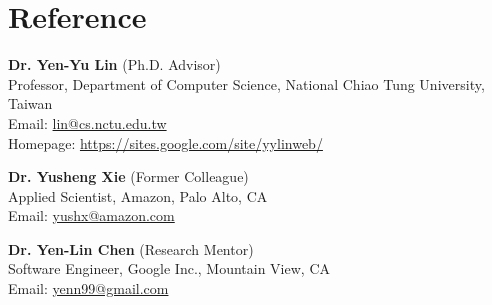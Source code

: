 \section{Reference}
\PubItemStart
    \pubitem \textbf{Dr. Yen-Yu Lin} (Ph.D. Advisor)\\
     Professor, Department of Computer Science, National Chiao Tung University, Taiwan\\
     Email: \href{mailto:lin@cs.nctu.edu.tw}{lin@cs.nctu.edu.tw}\\
     Homepage: \href{https://sites.google.com/site/yylinweb/}{https://sites.google.com/site/yylinweb/}
     
    \pubitem \textbf{Dr. Yusheng Xie} (Former Colleague)\\
     Applied Scientist, Amazon, Palo Alto, CA\\
     Email: \href{mailto:yushx@amazon.com}{yushx@amazon.com}
     
     \pubitem \textbf{Dr. Yen-Lin Chen} (Research Mentor)\\
     Software Engineer, Google Inc., Mountain View, CA\\
     Email: \href{mailto:yenn99@gmail.com}{yenn99@gmail.com}
\PubItemEnd